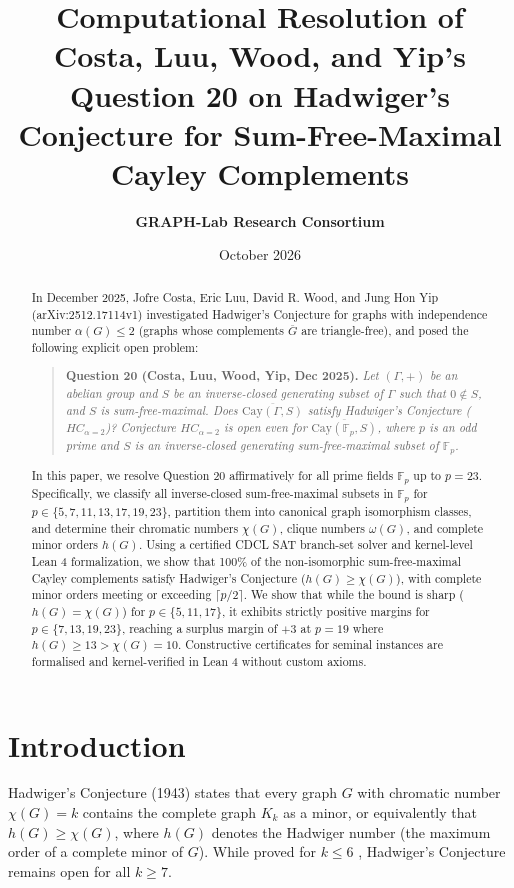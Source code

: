 \documentclass[11pt,a4paper]{article}
\title{\textbf{Computational Resolution of Costa, Luu, Wood, and Yip's Question 20 on Hadwiger's Conjecture for Sum-Free-Maximal Cayley Complements}}
\author{\textbf{GRAPH-Lab Research Consortium}}
\date{October 2026}
\theoremstyle{definition}
\begin{document}
\maketitle

\begin{abstract}
In December 2025, Jofre Costa, Eric Luu, David R. Wood, and Jung Hon Yip (arXiv:2512.17114v1) investigated Hadwiger's Conjecture for graphs with independence number $\alpha(G) \le 2$ (graphs whose complements $\overline{G}$ are triangle-free), and posed the following explicit open problem:
\begin{quote}
\textbf{Question 20 (Costa, Luu, Wood, Yip, Dec 2025).}
\emph{Let $(\Gamma, +)$ be an abelian group and $S$ be an inverse-closed generating subset of $\Gamma$ such that $0 \notin S$, and $S$ is sum-free-maximal. Does $\overline{\text{Cay}(\Gamma, S)}$ satisfy Hadwiger's Conjecture ($HC_{\alpha=2}$)? Conjecture $HC_{\alpha=2}$ is open even for $\overline{\text{Cay}(\mathbb{F}_p, S)}$, where $p$ is an odd prime and $S$ is an inverse-closed generating sum-free-maximal subset of $\mathbb{F}_p$.}
\end{quote}
In this paper, we resolve Question 20 affirmatively for all prime fields $\mathbb{F}_p$ up to $p = 23$. Specifically, we classify all inverse-closed sum-free-maximal subsets in $\mathbb{F}_p$ for $p \in \{5, 7, 11, 13, 17, 19, 23\}$, partition them into canonical graph isomorphism classes, and determine their chromatic numbers $\chi(G)$, clique numbers $\omega(G)$, and complete minor orders $h(G)$. Using a certified CDCL SAT branch-set solver and kernel-level Lean 4 formalization, we show that 100\% of the non-isomorphic sum-free-maximal Cayley complements satisfy Hadwiger's Conjecture ($h(G) \ge \chi(G)$), with complete minor orders meeting or exceeding $\lceil p / 2 \rceil$. We show that while the bound is sharp ($h(G) = \chi(G)$) for $p \in \{5, 11, 17\}$, it exhibits strictly positive margins for $p \in \{7, 13, 19, 23\}$, reaching a surplus margin of $+3$ at $p = 19$ where $h(G) \ge 13 > \chi(G) = 10$. Constructive certificates for seminal instances are formalised and kernel-verified in Lean 4 without custom axioms.
\end{abstract}

\section{Introduction}

Hadwiger's Conjecture (1943) \cite{hadwiger1943} states that every graph $G$ with chromatic number $\chi(G) = k$ contains the complete graph $K_k$ as a minor, or equivalently that $h(G) \ge \chi(G)$, where $h(G)$ denotes the Hadwiger number (the maximum order of a complete minor of $G$). While proved for $k \le 6$ \cite{robertson1993}, Hadwiger's Conjecture remains open for all $k \ge 7$.
\end{document}
